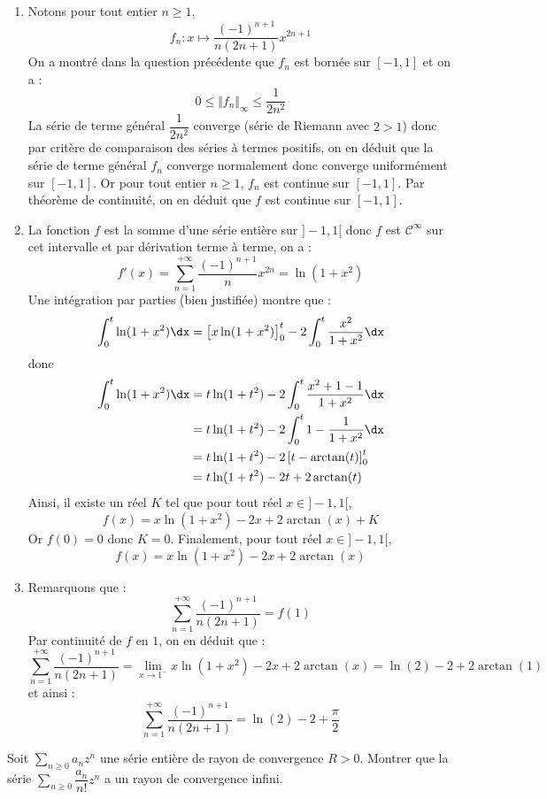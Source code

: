 \documentclass[a4paper,10pt]{report}
\newcommand{\Sum}[2]{\ensuremath{\textstyle{\sum\limits_{#1}^{#2}}}}
\begin{document}
\begin{enumerate}
\item Notons pour tout entier $n \geq 1$,
$$ f_n : x \mapsto \dfrac{(-1)^{n+1}}{n(2n+1)} x^{2n+1}$$
On a montré dans la question précédente que $f_n$ est bornée sur $[-1,1]$ et on a :
$$ 0 \leq \Vert f_n \Vert_{\infty} \leq  \dfrac{1}{2n^2}$$
La série de terme général $\dfrac{1}{2n^2}$ converge (série de Riemann avec $2>1$) donc par critère de comparaison des séries à termes positifs, on en déduit que la série de terme général $f_n$ converge normalement donc converge uniformément sur $[-1,1]$. Or pour tout entier $n \geq 1$, $f_n$ est continue sur $[-1,1]$. Par théorème de continuité, on en déduit que $f$ est continue sur $[-1,1]$.
\item La fonction $f$ est la somme d'une série entière sur $]-1,1[$ donc $f$ est $\mathcal{C}^{\infty}$ sur cet intervalle et par dérivation terme à terme, on a :
$$ f'(x) = \sum_{n=1}^{+ \infty}  \dfrac{(-1)^{n+1}}{n} x^{2n} = \ln(1+x^2)$$
Une intégration par parties (bien justifiée) montre que :
$$ \int_0^{t} \ln(1+x^2) \dx = \left[ x \ln(1+x^2) \right]_0^t - 2\int_0^t \dfrac{x^2}{1+x^2} \dx$$
donc 
\begin{align*}
 \int_0^{t} \ln(1+x^2) \dx & =  t \ln(1+t^2)  - 2\int_0^t \dfrac{x^2+1-1}{1+x^2} \dx \\
 & = t \ln(1+t^2)  - 2\int_0^t 1 - \dfrac{1}{1+x^2} \dx \\
 & = t \ln(1+t^2) - 2 \left[ t - \arctan(t) \right]_0^t \\
 & = t \ln(1+t^2) - 2t + 2 \arctan(t)
\end{align*}
Ainsi, il existe un réel $K$ tel que pour tout réel $x \in ]-1,1[$,
$$ f(x) = x \ln(1+x^2) - 2x + 2 \arctan(x) + K$$
Or $f(0)=0$ donc $K=0$. Finalement, pour tout réel $x \in ]-1,1[$,
$$ f(x) = x \ln(1+x^2) - 2x + 2 \arctan(x) $$
\item Remarquons que :
$$ \sum_{n=1}^{+ \infty} \dfrac{(-1)^{n+1}}{n(2n+1)}  = f(1)$$
Par continuité de $f$ en $1$, on en déduit que :
$$ \sum_{n=1}^{+ \infty} \dfrac{(-1)^{n+1}}{n(2n+1)} = \lim_{x \rightarrow 1^{-}}  x \ln(1+x^2) - 2x + 2 \arctan(x) =\ln(2)-2+ 2 \arctan(1)$$
et ainsi :
$$ \sum_{n=1}^{+ \infty} \dfrac{(-1)^{n+1}}{n(2n+1)} = \ln(2)-2 + \dfrac{\pi}{2}$$
\end{enumerate}

\begin{Exa}[\ding{80}] Soit $\Sum{n \geq 0}{} a_n z^n$ une série entière de rayon de convergence $R>0$. Montrer que  la série $\Sum{n \geq 0}{} \dfrac{a_n}{n!}z^n$ a un rayon de convergence infini. 
\end{Exa}
\end{document}
